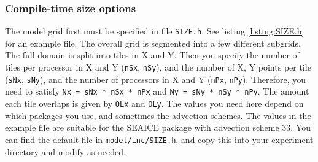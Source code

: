 \documentclass[11pt]{article}
\begin{document}
\subsubsection*{Compile-time size options}
The model grid first must be specified in file \verb|SIZE.h|. See listing \ref{listing:SIZE.h} for an example file. The overall grid is segmented into a few different subgrids. The full domain is split into tiles in X and Y. Then you specify the number of tiles per processor in X and Y (\verb|nSx|, \verb|nSy|), and the number of X, Y points per tile (\verb|sNx|, \verb|sNy|), and the number of processors in X and Y (\verb|nPx|, \verb|nPy|). Therefore, you need to satisfy \verb|Nx = sNx * nSx * nPx| and \verb|Ny = sNy * nSy * nPy|. The amount each tile overlaps is given by \verb|OLx| and \verb|OLy|. The values you need here depend on which packages you use, and sometimes the advection schemes. The values in the example file are suitable for the SEAICE package with advection scheme 33. You can find the default file in \verb|model/inc/SIZE.h|, and copy this into your experiment directory and modify as needed.
\end{document}
